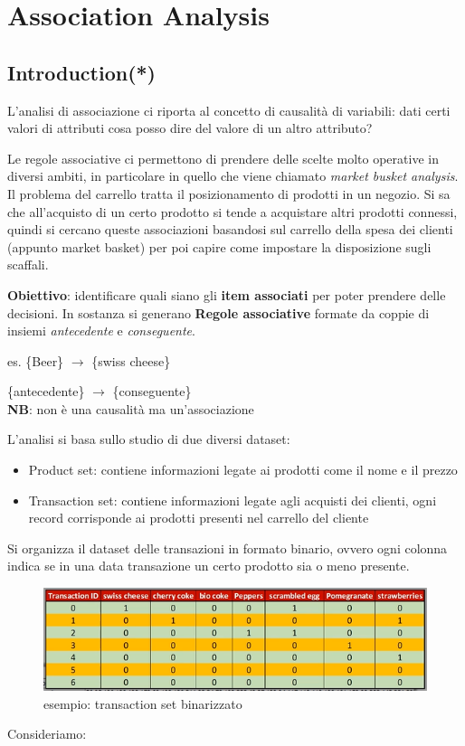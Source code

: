 

\section{Association Analysis}
\subsection{Introduction(*)}

L'analisi di associazione ci riporta al concetto di causalit\`a di variabili: dati certi valori di attributi cosa posso dire del valore di un altro attributo?

Le regole associative ci permettono di prendere delle scelte molto operative in diversi ambiti, in particolare in quello che viene chiamato \textit{market busket analysis}. 
Il problema del carrello tratta il posizionamento di prodotti in un negozio. Si sa che all'acquisto di un certo prodotto si tende a acquistare altri prodotti connessi, quindi si cercano queste associazioni basandosi sul carrello della spesa dei clienti (appunto market basket) per poi capire come impostare la disposizione sugli scaffali.

\textbf{Obiettivo}: identificare quali siano gli \textbf{item associati} per poter prendere delle decisioni. In sostanza si generano \textbf{Regole associative} formate da coppie di insiemi \textit{antecedente} e \textit{conseguente}.

es. \{Beer\} $\rightarrow$ \{swiss cheese\} 

\quad \{antecedente\} $\rightarrow$ \{conseguente\}\\
\textbf{NB}: non \`e una causalit\`a ma un'associazione

L'analisi si basa sullo studio di due diversi dataset:
\begin{itemize}
	\item Product set: contiene informazioni legate ai prodotti come il nome e il prezzo
	\item Transaction set: contiene informazioni legate agli acquisti dei clienti, ogni record corrisponde ai prodotti presenti nel carrello del cliente
\end{itemize}

Si organizza il dataset delle transazioni in formato binario, ovvero ogni colonna indica se in una data transazione un certo prodotto sia o meno presente.

\begin{figure}[H]
	\centering
	\includegraphics[height=0.25 \linewidth]{association/pict/transaction_set_bin.png}
	\caption{esempio: transaction set binarizzato}
\end{figure}
\clearpage
\noindent
Consideriamo:

